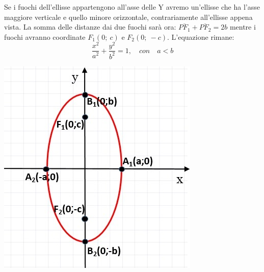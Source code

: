 \noindent \begin{minipage}{.75\textwidth}
   Se i fuochi dell'ellisse appartengono all'asse delle Y avremo 
un'ellisse che ha l'asse maggiore verticale e quello minore orizzontale,
contrariamente all'ellisse appena vista. La somma delle 
distanze dai due fuochi sarà ora: $\overline{PF_{1}}+\overline{PF_{2}}=2b$ 
mentre i fuochi avranno coordinate $ F_{1} (0;~c)$ e $ F_{2} (0;~-c)$. 
L'equazione rimane:
  \begin{equation}
  \dfrac{x^{2}}{a^{2}}+\dfrac{y^{2}}{b^{2}}=1, \quad con  \quad a<b
  \end{equation}
  
\end{minipage}
 \hspace{0.5cm}
 \begin{minipage}{.2\textwidth}
   \includegraphics[width=\textwidth]{img/ellisseassey.jpg}
\end{minipage}

